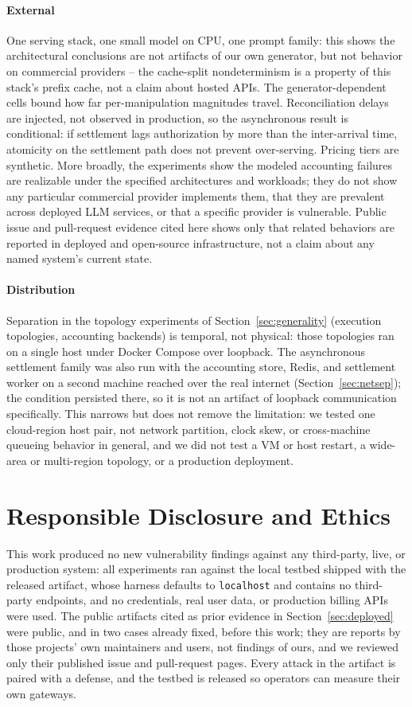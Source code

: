 \documentclass[manuscript,review]{acmart}
\begin{document}
\paragraph{External}
One serving stack, one small model on CPU, one prompt family: this shows the
architectural conclusions are not artifacts of our own generator, but not behavior on
commercial providers -- the cache-split nondeterminism is a property of this stack's
prefix cache, not a claim about hosted APIs. The generator-dependent cells bound how far
per-manipulation magnitudes travel. Reconciliation delays are injected, not observed in
production, so the asynchronous result is conditional: if settlement lags authorization by
more than the inter-arrival time, atomicity on the settlement path does not prevent
over-serving. Pricing tiers are synthetic. More broadly, the experiments show the modeled
accounting failures are realizable under the specified architectures and workloads; they
do not show any particular commercial provider implements them, that they are prevalent
across deployed LLM services, or that a specific provider is vulnerable. Public issue and
pull-request evidence cited here shows only that related behaviors are reported in
deployed and open-source infrastructure, not a claim about any named system's current
state.

\paragraph{Distribution}
Separation in the topology experiments of Section~\ref{sec:generality} (execution
topologies, accounting backends) is temporal, not physical: those topologies ran on a
single host under Docker Compose over loopback. The asynchronous settlement family was
also run with the accounting store, Redis, and settlement worker on a second machine
reached over the real internet (Section~\ref{sec:netsep}); the condition persisted there,
so it is not an artifact of loopback communication specifically. This narrows but does
not remove the limitation: we tested one cloud-region
host pair, not network partition, clock skew, or cross-machine queueing behavior in
general, and we did not test a VM or host restart, a wide-area or multi-region topology,
or a production deployment.

\section{Responsible Disclosure and Ethics}
This work produced no new vulnerability findings against any third-party, live, or
production system: all experiments ran against the local testbed shipped with the
released artifact, whose harness defaults to \texttt{localhost} and contains no
third-party endpoints, and no credentials, real user data, or production billing APIs
were used. The public artifacts cited as prior evidence in Section~\ref{sec:deployed}
were public, and in two cases already fixed, before this work; they are reports by those
projects' own maintainers and users, not findings of ours, and we reviewed only their
published issue and pull-request pages. Every attack in the artifact is paired with a
defense, and the testbed is released so operators can measure their own gateways.
\end{document}
